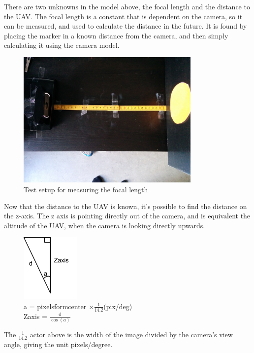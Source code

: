 There are two unknowns in the model above, the focal length and the distance to the UAV. The focal length is a constant that is dependent on the camera, so it can be measured, and used to calculate the distance in the future. 
It is found by placing the marker in a known distance from the camera, and then simply calculating it using the camera model.

\begin{figure}[h!]
	\centering
	\includegraphics[width=0.8\textwidth]{imgs/focal_length_test}
	\caption{Test setup for measuring the focal length}
\end{figure}

Now that the distance to the UAV is known, it's possible to find the distance on the z-axis. The z axis is pointing directly out of the camera, and is equivalent the altitude of the UAV, when the camera is looking directly upwards. 

\begin{figure}[h!]
	\centering
	\includegraphics{imgs/focal_length_z_length}\\
	a = pixelsformcenter\! $ \times \frac{1}{14.2}$(pix/deg)\\
	Zaxis = $\frac{\mathrm{d}}{\cos{(a)}}$
\end{figure}

The $\frac{1}{14.2}$ actor above is the width of the image divided by the camera's view angle, giving the unit pixels/degree.

